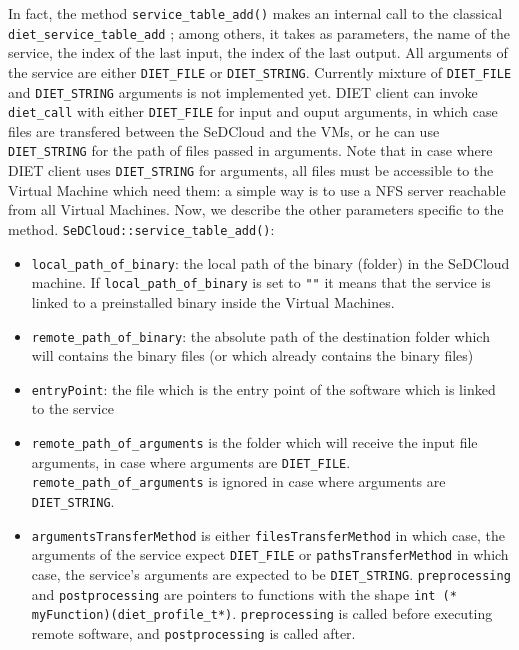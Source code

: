 In fact, the method \texttt{service\_table\_add()} makes an internal
call to the classical\\ \texttt{diet\_service\_table\_add} ; among
others, it takes as parameters, the name of the service, the index of
the last input, the index of the last output. All arguments of the
service are either \texttt{DIET\_FILE} or
\texttt{DIET\_STRING}. Currently mixture of \texttt{DIET\_FILE} and
\texttt{DIET\_STRING} arguments is not implemented yet. DIET client
can invoke \texttt{diet\_call} with either \texttt{DIET\_FILE} for
input and ouput arguments, in which case files are transfered between
the SeDCloud and the VMs, or he can use \texttt{DIET\_STRING} for the
path of files passed in arguments. Note that in case where DIET client
uses \texttt{DIET\_STRING} for arguments, all files must be accessible
to the Virtual Machine which need them: a simple way is to use a NFS
server reachable from all Virtual Machines. Now, we describe the other
parameters specific to the method.
\texttt{SeDCloud::service\_table\_add()}:
 \begin{itemize}
   \item \texttt{local\_path\_of\_binary}: the local path of the
     binary (folder) in the SeDCloud machine. If
     \texttt{local\_path\_of\_binary} is set to \texttt{""} it means
     that the service is linked to a preinstalled binary inside the
     Virtual Machines.
   \item \texttt{remote\_path\_of\_binary}: the absolute path of the
     destination folder which will contains the binary files (or which
     already contains the binary files)
   \item \texttt{entryPoint}: the file which is the entry point of the
     software which is linked to the service
   \item \texttt{remote\_path\_of\_arguments} is the folder which will
     receive the input file arguments, in case where arguments are
     \texttt{DIET\_FILE}.  \texttt{remote\_path\_of\_arguments} is
     ignored in case where arguments are \texttt{DIET\_STRING}.
   \item \texttt{argumentsTransferMethod} is either
     \texttt{filesTransferMethod} in which case, the arguments of the
     service expect \texttt{DIET\_FILE} or
     \texttt{pathsTransferMethod} in which case, the service's
     arguments are expected to be \texttt{DIET\_STRING}.
     \texttt{preprocessing} and \texttt{postprocessing} are pointers
     to functions with the shape \texttt{int (*
       myFunction)(diet\_profile\_t*)}. \texttt{preprocessing} is
     called before executing remote software, and
     \texttt{postprocessing} is called after.
 \end{itemize}


